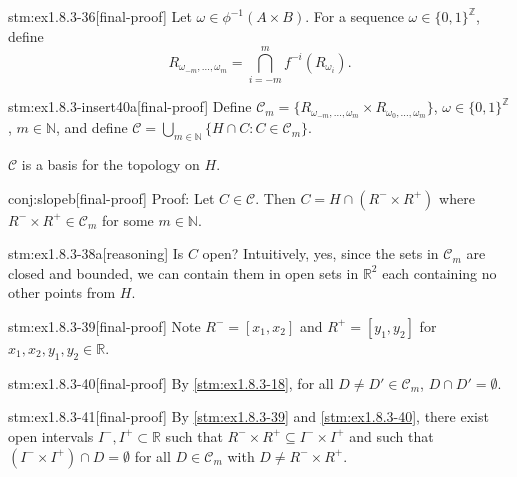 \begin{stm}{stm:ex1.8.3-36}[final-proof]
Let $\omega \in \phi^{-1}(A \times B)$. For a sequence $\omega \in \{0,1\}^\mathbb{Z}$, define 
\[
R_{\omega_{-m}, \ldots, \omega_{m}} = \bigcap_{i = -m}^m f^{-i}(R_{\omega_i}).
\]
\end{stm}

\begin{stm}{stm:ex1.8.3-insert40a}[final-proof]
Define $\mathcal{C}_m = \{ R_{\omega_{-m},\ldots,\omega_m} \times R_{\omega_0,\ldots,\omega_m} \}$, $\omega \in \{0,1\}^\mathbb{Z}$, $m \in \mathbb{N}$, and define $\mathcal{C} = \bigcup_{m \in \mathbb{N}} \{ H \cap C : C \in \mathcal{C}_m \}$.
\end{stm}

\begin{conj}\label{conj:slope}
$\mathcal{C}$ is a basis for the topology on $H$.
\end{conj}

\begin{stm}{conj:slopeb}[final-proof]
Proof: Let $C \in \mathcal{C}$. Then $C = H \cap (R^- \times R^+)$ where $R^- \times R^+ \in \mathcal{C}_m$ for some $m \in \mathbb{N}$.
\end{stm}

\begin{stm}{stm:ex1.8.3-38a}[reasoning]
Is $C$ open? Intuitively, yes, since the sets in $\mathcal{C}_m$ are closed and bounded, we can contain them in open sets in $\mathbb{R}^2$ each containing no other points from $H$.
\end{stm}

\begin{stm}{stm:ex1.8.3-39}[final-proof]
Note $R^- = [x_1, x_2]$ and $R^+ = [y_1, y_2]$ for $x_1,x_2,y_1,y_2 \in \mathbb{R}$.
\end{stm}

\begin{stm}{stm:ex1.8.3-40}[final-proof]
By \ref{stm:ex1.8.3-18}, for all $D \ne D' \in \mathcal{C}_m$, $D \cap D' = \emptyset$.
\end{stm}

\begin{stm}{stm:ex1.8.3-41}[final-proof]
By \ref{stm:ex1.8.3-39} and \ref{stm:ex1.8.3-40}, there exist open intervals $I^-, I^+ \subset \mathbb{R}$ such that $R^- \times R^+ \subseteq I^- \times I^+$ and such that $(I^- \times I^+) \cap D = \emptyset$ for all $D \in \mathcal{C}_m$ with $D \ne R^- \times R^+$. 
\end{stm}


